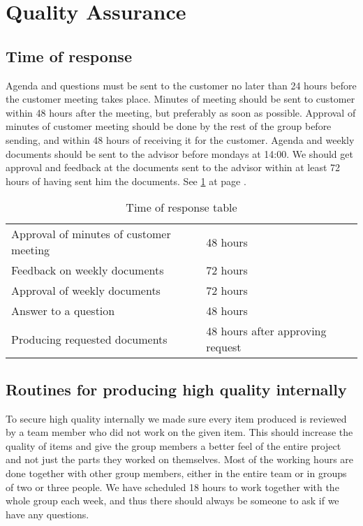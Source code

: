 \section{Quality Assurance}

\subsection{Time of response}
Agenda and questions must be sent to the customer no later than 24 hours before the customer meeting takes place. 
Minutes of meeting should be sent to customer within 48 hours after the meeting, but preferably as soon as possible.
Approval of minutes of customer meeting should be done by the rest of the group before sending, and within 48 hours of receiving it for the customer. Agenda and weekly documents should be sent to the advisor before mondays at 14:00.
We should get approval and feedback at the documents sent to the advisor within at least 72 hours of having sent him the documents.
\newline
\newline
See \ref{tab:responsetable} at page \pageref{tab:responsetable}.

\begin{table}
\begin{tabular}{l|l}
Approval of minutes of customer meeting & 48 hours \\
Feedback on weekly documents & 72 hours \\
Approval of weekly documents & 72 hours \\
Answer to a question & 48 hours \\
Producing requested documents & 48 hours after approving request
\end{tabular}
\caption{Time of response table}\label{tab:responsetable}
\end{table}

\subsection{Routines for producing high quality internally}
To secure high quality internally we made sure every item produced is reviewed by a team member who did not work on the given item. This should increase the quality of items and give the group members a better feel of the entire project and not just the parts they worked on themselves. 
\newline
\newline
Most of the working hours are done together with other group members, either in the entire team or in groups of two or three people. We have scheduled 18 hours to work together with the whole group each week, and thus there should always be someone to ask if we have any questions.

